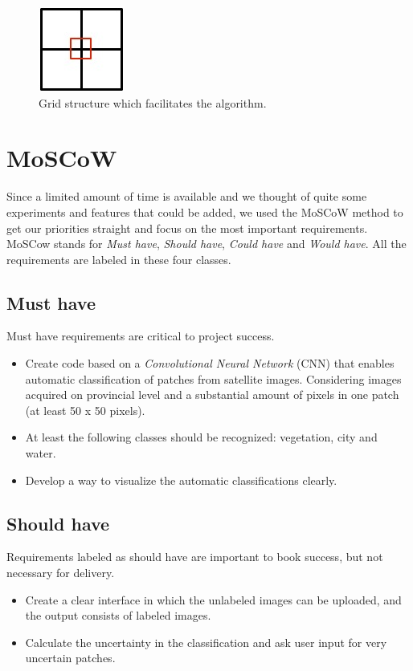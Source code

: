 \documentclass[a4paper,onecolumn]{report}
\begin{document}
\begin{figure}[h!]
    \centering
    \includegraphics[scale=0.6]{./images/grid.jpg}
    \caption{Grid structure which facilitates the algorithm.}
	\label{fig:grid}
\end{figure}

\section{MoSCoW}
Since a limited amount of time is available and we thought of quite some experiments and features that could be added, we used the MoSCoW method to get our priorities straight and focus on the most important requirements. MoSCow stands for \textit{Must have}, \textit{Should have}, \textit{Could have} and \textit{Would have}. All the requirements are labeled in these four classes.\\

\subsection{Must have}
Must have requirements are critical to project success. 
\begin{itemize}
\item Create code based on a \textit{Convolutional Neural Network} (CNN) that enables automatic classification of patches from satellite images. Considering images acquired on provincial level and a substantial amount of pixels in one patch (at least 50 x 50 pixels). 
\item At least the following classes should be recognized: vegetation, city and water. 
\item Develop a way to visualize the automatic classifications clearly.
\end{itemize}

\subsection{Should have}
Requirements labeled as should have are important to book success, but not necessary for delivery. 

\begin{itemize}
\item Create a clear interface in which the unlabeled images can be uploaded, and the output consists of labeled images. 
\item Calculate the uncertainty in the classification and ask user input for very uncertain patches.
\end{itemize}
\end{document}
